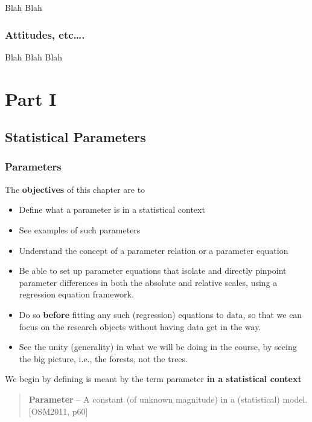 \documentclass[]{book}
\begin{document}
Blah Blah

\hypertarget{attitudes-etc.}{%
\section{Attitudes, etc\ldots{}.}\label{attitudes-etc.}}

Blah Blah Blah

\hypertarget{part-part-i}{%
\part{Part I}\label{part-part-i}}

\hypertarget{paras}{%
\chapter{Statistical Parameters}\label{paras}}

\hypertarget{parameters}{%
\section{Parameters}\label{parameters}}

The \textbf{objectives} of this chapter are to

\begin{itemize}
\item
  Define what a parameter is in a statistical context
\item
  See examples of such parameters
\item
  Understand the concept of a parameter relation or a parameter equation
\item
  Be able to set up parameter equations that isolate and directly pinpoint parameter differences in both the absolute and relative scales, using a regression equation framework.
\item
  Do so \textbf{before} fitting any such (regression) equations to data, so that we can focus on the research objects without having data get in the way.
\item
  See the unity (generality) in what we will be doing in the course, by seeing the big picture, i.e., the forests, not the trees.
\end{itemize}

We begin by defining is meant by the term parameter \textbf{in a statistical context}

\begin{quote}
\textbf{Parameter} -- A constant (of unknown magnitude) in a (statistical) model. {[}OSM2011, p60{]}
\end{quote}
\end{document}
